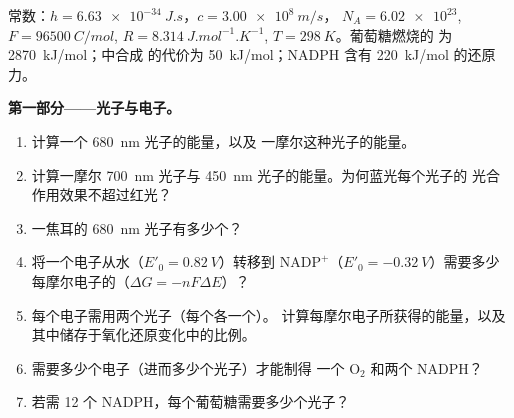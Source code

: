\begin{problem}
\label{pb:b1:photosynthesis:1}
常数：$h = \qty{6.63e-34}{J.s}$，$c = \qty{3.00e8}{m/s}$，
$N_A = \num{6.02e23}$, $F = \qty{96500}{C/mol}$, $R = \qty{8.314}{J.mol^{-1}.K^{-1}}$,
$T = \qty{298}{K}$。葡萄糖燃烧的
为 \qty{2870}{kJ/mol}；中合成  的代价为
\qty{50}{kJ/mol}；NADPH 含有 \qty{220}{kJ/mol} 的还原力。

\medskip
\noindent\textbf{第一部分——光子与电子。}
\begin{enumerate}
  \item 计算一个 \qty{680}{nm} 光子的能量，以及
        一摩尔这种光子的能量。
  \item 计算一摩尔 \qty{700}{nm} 光子与
        \qty{450}{nm} 光子的能量。为何蓝光每个光子的
        光合作用效果不超过红光？
  \item 一焦耳的 \qty{680}{nm} 光子有多少个？
  \item 将一个电子从水（$E'_0 = \qty{+0.82}{V}$）转移到
        $\mathrm{NADP^+}$（$E'_0 = \qty{-0.32}{V}$）需要多少
        每摩尔电子的（$\Delta G = -nF\Delta E$）？
  \item 每个电子需用两个光子（每个各一个）。
        计算每摩尔电子所获得的能量，以及
        其中储存于氧化还原变化中的比例。
  \item 需要多少个电子（进而多少个光子）才能制得
        一个 $\mathrm{O_2}$ 和两个 NADPH？
  \item 若需 12 个 NADPH，每个葡萄糖需要多少个光子？
\end{enumerate}


\end{problem}
